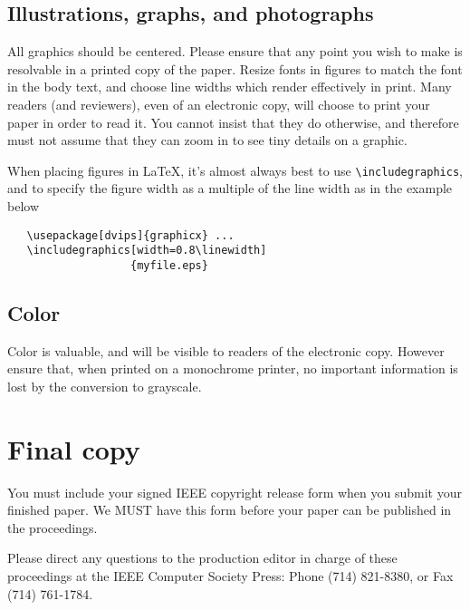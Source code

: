 \documentclass[10pt,twocolumn,letterpaper]{article}
\begin{document}
\subsection{Illustrations, graphs, and photographs}

All graphics should be centered.  Please ensure that any point you wish to
make is resolvable in a printed copy of the paper.  Resize fonts in figures
to match the font in the body text, and choose line widths which render
effectively in print.  Many readers (and reviewers), even of an electronic
copy, will choose to print your paper in order to read it.  You cannot
insist that they do otherwise, and therefore must not assume that they can
zoom in to see tiny details on a graphic.

When placing figures in \LaTeX, it's almost always best to use
\verb+\includegraphics+, and to specify the  figure width as a multiple of
the line width as in the example below
{\small\begin{verbatim}
   \usepackage[dvips]{graphicx} ...
   \includegraphics[width=0.8\linewidth]
                   {myfile.eps}
\end{verbatim}
}


\subsection{Color}

Color is valuable, and will be visible to readers of the electronic copy.
However ensure that, when printed on a monochrome printer, no important
information is lost by the conversion to grayscale.

\section{Final copy}

You must include your signed IEEE copyright release form when you submit
your finished paper. We MUST have this form before your paper can be
published in the proceedings.

Please direct any questions to the production editor in charge of these
proceedings at the IEEE Computer Society Press: Phone (714) 821-8380, or
Fax (714) 761-1784.

{\small


}
\end{document}

